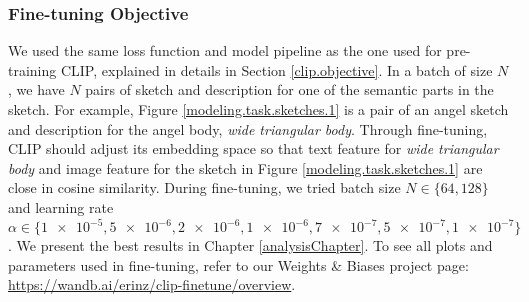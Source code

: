 \subsubsection*{Fine-tuning Objective} \label{finetune.objective}
We used the same loss function and model pipeline as the one used for pre-training CLIP, explained in details in Section \ref{clip.objective}. 
In a batch of size $N$, we have $N$ pairs of sketch and description for one of the semantic parts in the sketch. 
For example, Figure \ref{modeling.task.sketches.1} is a pair of an angel sketch and description for the angel body, \textit{wide triangular body}.
Through fine-tuning, CLIP should adjust its embedding space so that text feature for \textit{wide triangular body} and image feature for the sketch in Figure \ref{modeling.task.sketches.1} are close in cosine similarity.  
During fine-tuning, we tried batch size $N \in \{64,128\}$ 
and learning rate $\alpha \in \{\num{1e-5}, \num{5e-6}, \num{2e-6}, \num{1e-6}, \num{7e-7}, \num{5e-7}, \num{1e-7}\}$. We present the best results in Chapter \ref{analysisChapter}. To see all plots and parameters used in fine-tuning, refer to our Weights \& Biases project page: \url{https://wandb.ai/erinz/clip-finetune/overview}.
%  



